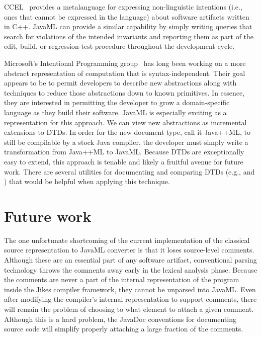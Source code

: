 \documentclass{article}
\begin{document}
\begin{multicols}{2}
CCEL~\cite{CCEL92} provides a metalanguage for expressing non-linguistic
intentions (i.e., ones that cannot be expressed in the language) about
software artifacts written in C++.  JavaML can provide a similar
capability by simply writing queries that search for violations of the
intended invariants and reporting them as part of the edit, build, or
regression-test procedure throughout the development cycle.

Microsoft's Intentional Programming group~\cite{Simonyi96} has long been
working on a more abstract representation of computation that is
syntax-independent.  Their goal appears to be to permit developers to
describe new abstractions along with techniques to reduce those
abstractions down to known primitives.  In essence, they are interested
in permitting the developer to grow a domain-specific language as they
build their software.  JavaML is especially exciting as a representation
for this approach.  We can view new abstractions as incremental
extensions to DTDs.  In order for the new document type, call it
Java++ML, to still be compilable by a stock Java compiler, the developer
must simply write a transformation from Java++ML to JavaML.  Because
DTDs are exceptionally easy to extend, this approach is tenable and
likely a fruitful avenue for future work.  There are several utilities
for documenting and comparing DTDs (e.g.,  and
) that would be helpful when applying this technique.



\section{Future work}
\label{sec-future}

The one unfortunate shortcoming of the current implementation of the
classical source representation to JavaML converter is that it loses
source-level comments.  Although these are an essential part of any
software artifact, conventional parsing technology throws the comments
away early in the lexical analysis phase.  Because the comments are
never a part of the internal representation of the program inside the
Jikes compiler framework, they cannot be unparsed into JavaML.  Even
after modifying the compiler's internal representation to support
comments, there will remain the problem of choosing to what element to
attach a given comment.  Although this is a hard problem, the JavaDoc
conventions for documenting source code will simplify properly attaching
a large fraction of the comments.


\end{multicols}
\end{document}
